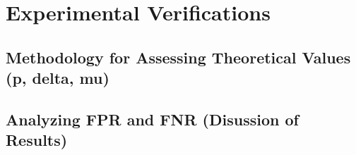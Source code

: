 \section{Experimental Verifications}

\subsection{Methodology for Assessing Theoretical Values (p, delta, mu)}

\subsection{Analyzing FPR and FNR (Disussion of Results)}